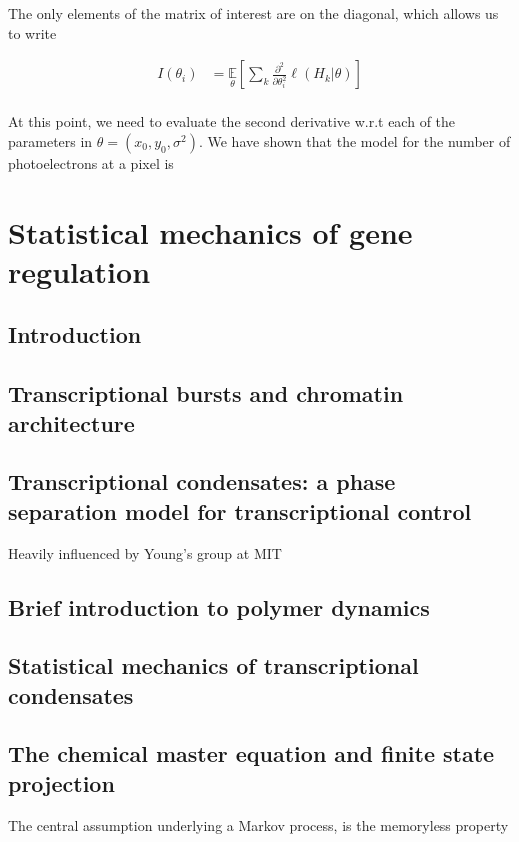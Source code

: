 \documentclass{ucetd}
\begin{document}
The only elements of the matrix of interest are on the diagonal, which allows us to write

\begin{align*}
I(\theta_{i}) &= \underset{\theta}{\mathbb{E}}\left[\sum_{k}\frac{\partial^{2}}{\partial\theta_{i}^{2}}  \ell (H_{k}|\theta)\right]\\
\end{align*}

At this point, we need to evaluate the second derivative w.r.t each of the parameters in $\theta = (x_{0},y_{0},\sigma^{2})$. We have shown that the model for the number of photoelectrons at a pixel is


\chapter{Statistical mechanics of gene regulation}

\section{Introduction}

\section{Transcriptional bursts and chromatin architecture}

\section{Transcriptional condensates: a phase separation model for transcriptional control}

Heavily influenced by Young's group at MIT


\section{Brief introduction to polymer dynamics}

\section{Statistical mechanics of transcriptional condensates}

\section{The chemical master equation and finite state projection}

The central assumption underlying a Markov process, is the memoryless property
\end{document}
